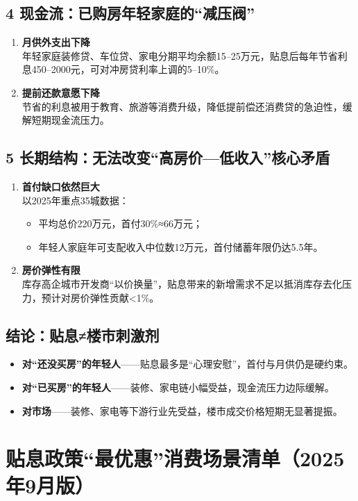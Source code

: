 \subsection{4 现金流：已购房年轻家庭的“减压阀”}
\begin{enumerate}[leftmargin=*, nosep]
  \item \textbf{月供外支出下降}  \\
  年轻家庭装修贷、车位贷、家电分期平均余额15–25万元，贴息后每年节省利息450–2000元，可对冲房贷利率上调的5–10\%。
  \item \textbf{提前还款意愿下降}  \\
  节省的利息被用于教育、旅游等消费升级，降低提前偿还消费贷的急迫性，缓解短期现金流压力。
\end{enumerate}

\subsection{5 长期结构：无法改变“高房价—低收入”核心矛盾}
\begin{enumerate}[leftmargin=*, nosep]
  \item \textbf{首付缺口依然巨大}  \\
  以2025年重点35城数据：  
  \begin{itemize}
    \item 平均总价220万元，首付30\%≈66万元；  
    \item 年轻人家庭年可支配收入中位数12万元，首付储蓄年限仍达5.5年。
  \end{itemize}
  \item \textbf{房价弹性有限}  \\
  库存高企城市开发商“以价换量”，贴息带来的新增需求不足以抵消库存去化压力，预计对房价弹性贡献<1\%。
\end{enumerate}

\subsection{结论：贴息≠楼市刺激剂}
\begin{itemize}
  \item \textbf{对“还没买房”的年轻人}——贴息最多是“心理安慰”，首付与月供仍是硬约束。
  \item \textbf{对“已买房”的年轻人}——装修、家电链小幅受益，现金流压力边际缓解。
  \item \textbf{对市场}——装修、家电等下游行业先受益，楼市成交价格短期无显著提振。
\end{itemize}


\section{贴息政策“最优惠”消费场景清单（2025年9月版）}

